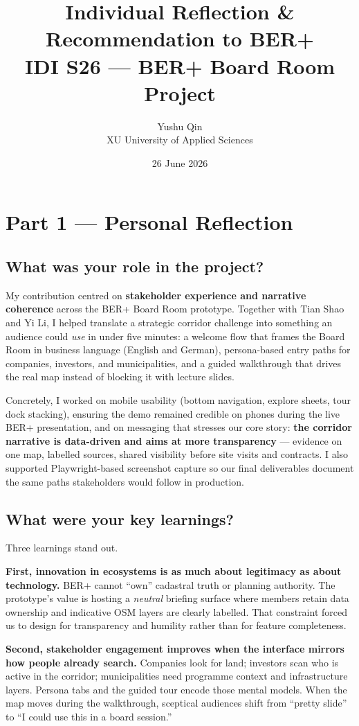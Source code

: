 \documentclass[11pt,a4paper]{article}
\title{Individual Reflection \& Recommendation to BER+\\[0.4em]
\large IDI S26 — BER+ Board Room Project}
\author{Yushu Qin\\XU University of Applied Sciences}
\date{26 June 2026}
\begin{document}
\maketitle

\section*{Part 1 — Personal Reflection}

\subsection*{What was your role in the project?}
My contribution centred on \textbf{stakeholder experience and narrative coherence} across the BER+ Board Room prototype. Together with Tian Shao and Yi Li, I helped translate a strategic corridor challenge into something an audience could \textit{use} in under five minutes: a welcome flow that frames the Board Room in business language (English and German), persona-based entry paths for companies, investors, and municipalities, and a guided walkthrough that drives the real map instead of blocking it with lecture slides.

Concretely, I worked on mobile usability (bottom navigation, explore sheets, tour dock stacking), ensuring the demo remained credible on phones during the live BER+ presentation, and on messaging that stresses our core story: \textbf{the corridor narrative is data-driven and aims at more transparency} — evidence on one map, labelled sources, shared visibility before site visits and contracts. I also supported Playwright-based screenshot capture so our final deliverables document the same paths stakeholders would follow in production.

\subsection*{What were your key learnings?}
Three learnings stand out.

\textbf{First, innovation in ecosystems is as much about legitimacy as about technology.} BER+ cannot ``own'' cadastral truth or planning authority. The prototype's value is hosting a \textit{neutral} briefing surface where members retain data ownership and indicative OSM layers are clearly labelled. That constraint forced us to design for transparency and humility rather than for feature completeness.

\textbf{Second, stakeholder engagement improves when the interface mirrors how people already search.} Companies look for land; investors scan who is active in the corridor; municipalities need programme context and infrastructure layers. Persona tabs and the guided tour encode those mental models. When the map moves during the walkthrough, sceptical audiences shift from ``pretty slide'' to ``I could use this in a board session.''
\end{document}
